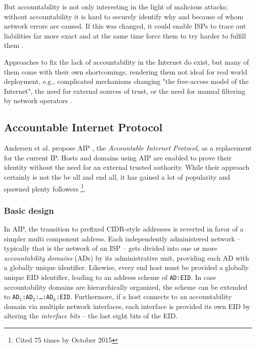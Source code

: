 \documentclass{acm_proc_article-sp}
\begin{document}
But accountability is not only interesting in the light of malicious attacks; without accountability it is hard to securely identify why and because of whom network errors are caused. If this was changed, it could enable ISPs to trace out liabilities far more exact and at the same time force them to try harder to fulfill them \cite{mot}. 

Approaches to fix the lack of accountability in the Internet do exist, but many of them come with their own shortcomings, rendering them not ideal for real world deployment, e.g., complicated mechanisms changing "the free-access model of the Internet", the need for external sources of trust, or the need for manual filtering by network operators \cite{aip}. 


\subsection{Accountable Internet Protocol}
\label{sec:aip}
Andersen et al. propose AIP \cite{aip}, the \emph{Accountable Internet Protocol}, as a replacement for the current IP. Hosts and domains using AIP are enabled to prove their identity without the need for an external trusted authority. While their approach certainly is not the be all and end all, it has gained a lot of popularity and spawned plenty followers \footnote{Cited 75 times by October 2015}.

\subsubsection{Basic design}
\label{sec:aipbd}

In AIP, the transition to prefixed CIDR-style addresses is reverted in favor of a simpler multi component address. Each independently administered network -- typically that is the network of an ISP -- gets divided into one or more \emph{accountability domains} (ADs) by its administrative unit, providing each AD with a globally unique identifier. Likewise, every end host must be provided a globally unique EID identifier, leading to an address scheme of \texttt{AD:EID}. In case accountability domains are hierarchically organized, the scheme can be extended to \texttt{AD$_1$:AD$_2$:\ldots:AD$_k$:EID}. Furthermore, if a host connects to an accountability domain via multiple network interfaces, each interface is provided its own EID by altering the \emph{interface bits} -- the last eight bits of the EID.
\end{document}
